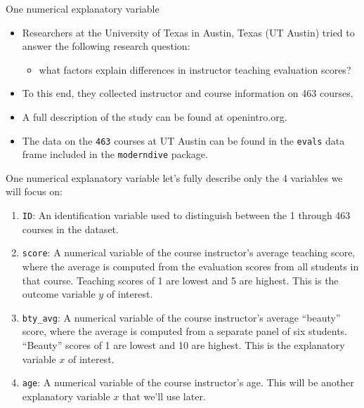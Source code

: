 \documentclass[
  ignorenonframetext,
]{beamer}
\providecommand{\tightlist}{%
  \setlength{\itemsep}{0pt}\setlength{\parskip}{0pt}}
\begin{document}
\begin{frame}[fragile]{One numerical explanatory variable}
\protect\hypertarget{one-numerical-explanatory-variable}{}
\begin{itemize}
\item
  Researchers at the University of Texas in Austin, Texas (UT Austin)
  tried to answer the following research question:

  \begin{itemize}
  \tightlist
  \item
    what factors explain differences in instructor teaching evaluation
    scores?
  \end{itemize}
\item
  To this end, they collected instructor and course information on 463
  courses.
\item
  A full description of the study can be found at openintro.org.
\item
  The data on the \texttt{463} courses at UT Austin can be found in the
  \texttt{evals} data frame included in the \texttt{moderndive} package.
\end{itemize}
\end{frame}

\begin{frame}[fragile]{One numerical explanatory variable}
\protect\hypertarget{one-numerical-explanatory-variable-1}{}
let's fully describe only the 4 variables we will focus on:

\begin{enumerate}
\item
  \texttt{ID}: An identification variable used to distinguish between
  the 1 through 463 courses in the dataset.
\item
  \texttt{score}: A numerical variable of the course instructor's
  average teaching score, where the average is computed from the
  evaluation scores from all students in that course. Teaching scores of
  1 are lowest and 5 are highest. This is the outcome variable \(y\) of
  interest.
\item
  \texttt{bty\_avg}: A numerical variable of the course instructor's
  average ``beauty'' score, where the average is computed from a
  separate panel of six students. ``Beauty'' scores of 1 are lowest and
  10 are highest. This is the explanatory variable \(x\) of interest.
\item
  \texttt{age}: A numerical variable of the course instructor's age.
  This will be another explanatory variable \(x\) that we'll use later.
\end{enumerate}
\end{frame}
\end{document}
